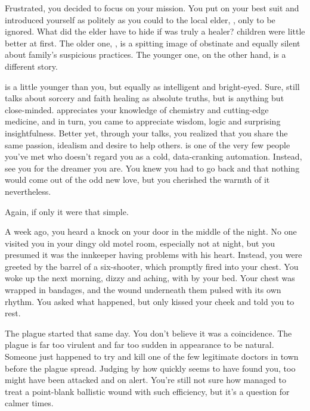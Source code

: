 \documentclass[char]{Pestilence}
\begin{document}
Frustrated, you decided to focus on your mission. You put on your best suit and introduced yourself as politely as you could to the local elder, \cElder{\intro}, only to be ignored. What did the elder have to hide if \cElder{\they} was truly a healer? \cElder{\Their} children were little better at first. The older one, \cApprentice{}, is a spitting image of \cApprentice{\their} obstinate \cElder{\parent} and equally silent about \cApprentice{\their} family's suspicious practices. The younger one, on the other hand, is a different story.

\cRebel{} is a little younger than you, but equally as intelligent and bright-eyed. Sure, \cRebel{\they} still talks about sorcery and faith healing as absolute truths, but \cRebel{\they} is anything but close-minded. \cRebel{} appreciates your knowledge of chemistry and cutting-edge medicine, and in turn, you came to appreciate \cRebel{\their} wisdom, logic and surprising insightfulness. Better yet, through your talks, you realized that you share the same passion, idealism and desire to help others. \cRebel{} is one of the very few people you've met who doesn't regard you as a cold, data-cranking automation. Instead, \cRebel{\they} see you for the dreamer you are. You knew you had to go back and that nothing would come out of the odd new love, but you cherished the warmth of it nevertheless.

Again, if only it were that simple. 

A week ago, you heard a knock on your door in the middle of the night. No one visited you in your dingy old motel room, especially not at night, but you presumed it was the innkeeper having problems with his heart. Instead, you were greeted by the barrel of a six-shooter, which promptly fired into your chest. You woke up the next morning, dizzy and aching, with \cRebel{} by your bed. Your chest was wrapped in bandages, and the wound underneath them pulsed with its own rhythm. You asked \cRebel{} what happened, but \cRebel{\they} only kissed your cheek and told you to rest.

The plague started that same day. You don't believe it was a coincidence. The plague is far too virulent and far too sudden in appearance to be natural. Someone just happened to try and kill one of the few legitimate doctors in town before the plague spread. Judging by how quickly \cRebel{} seems to have found you, \cRebel{\they} too might have been attacked and on alert. You're still not sure how \cRebel{} managed to treat a point-blank ballistic wound with such efficiency, but it's a question for calmer times. 
\end{document}
